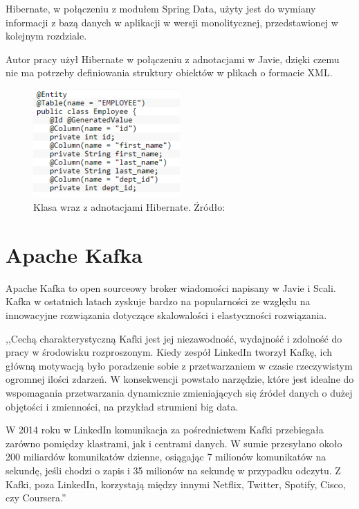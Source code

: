 Hibernate, w połączeniu z modułem Spring Data, użyty jest do wymiany informacji z bazą danych w aplikacji w wersji monolitycznej, przedstawionej w kolejnym rozdziale.

Autor pracy użył Hibernate w połączeniu z adnotacjami w Javie, dzięki czemu nie ma potrzeby definiowania struktury obiektów w plikach o formacie XML.


\begin{figure}[h!]
  \centering
    \includegraphics[width=0.5\textwidth]{images/hibernate.PNG}
  \caption{Klasa wraz z adnotacjami Hibernate. Źródło: \cite{Hibernate2}}
\end{figure}



\section{Apache Kafka}

Apache Kafka to open sourceowy broker wiadomości napisany w Javie i Scali.  Kafka w ostatnich latach zyskuje bardzo na popularności ze względu na innowacyjne rozwiązania dotyczące skalowalości i elastyczności rozwiązania. 

,,Cechą charakterystyczną Kafki jest jej niezawodność, wydajność i zdolność do pracy w środowisku rozproszonym. Kiedy zespół LinkedIn tworzył Kafkę, ich główną motywacją było poradzenie sobie z przetwarzaniem w czasie rzeczywistym ogromnej ilości zdarzeń. W konsekwencji powstało narzędzie, które jest idealne do wspomagania przetwarzania dynamicznie zmieniających się źródeł danych o dużej objętości i zmienności, na przykład strumieni big data.

W 2014 roku w LinkedIn komunikacja za pośrednictwem Kafki przebiegała zarówno pomiędzy klastrami, jak i centrami danych. W sumie przesyłano około 200 miliardów komunikatów dzienne, osiągając 7 milionów komunikatów na sekundę, jeśli chodzi o zapis i 35 milionów na sekundę w przypadku odczytu. Z Kafki, poza LinkedIn, korzystają między innymi Netflix, Twitter, Spotify, Cisco, czy Coursera.''\cite{Kafka}

